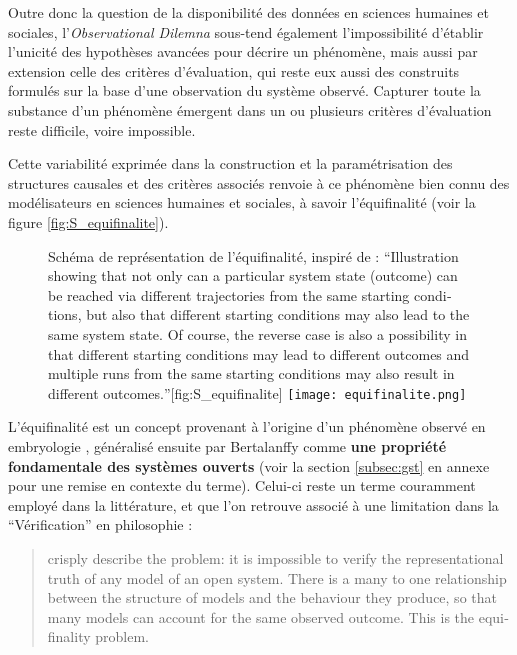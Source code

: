 Outre donc la question de la disponibilité des données en sciences humaines et sociales, l'\textit{Observational Dilemna} sous-tend également l'impossibilité d'établir l'unicité des hypothèses avancées pour décrire un phénomène, mais aussi par extension celle des critères d'évaluation, qui reste eux aussi des construits  formulés sur la base d'une observation du système observé. Capturer toute la substance d'un phénomène émergent dans un ou plusieurs critères d'évaluation reste difficile, voire impossible.

Cette variabilité exprimée dans la construction et la paramétrisation des structures causales et des critères associés renvoie à ce phénomène bien connu des modélisateurs en sciences humaines et sociales, à savoir l'équifinalité (voir la figure \ref{fig:S_equifinalite}).

\begin{figure}[htbp]
\begin{sidecaption}[fortoc]{Schéma de représentation de l'équifinalité, inspiré de \autocite{Richardson2002} : \foreignquote{english}{Illustration showing that not only can a particular system state (outcome) can be reached via different trajectories from the same starting conditions, but also that different starting conditions may also lead to the same system state. Of course, the reverse case is also a possibility in that different starting conditions may lead to different outcomes and multiple runs from the same starting conditions may also result in different outcomes.}}[fig:S_equifinalite]
  \centering
 \texttt{[image: equifinalite.png]}
  \end{sidecaption}
\end{figure}

L'équifinalité est un concept provenant à l'origine d'un phénomène observé en embryologie , généralisé ensuite par Bertalanffy comme \textbf{une propriété fondamentale des systèmes ouverts} (voir la section \ref{subsec:gst} en annexe pour une remise en contexte du terme). Celui-ci reste un terme couramment employé dans la littérature, et que l'on retrouve associé à une limitation dans la \enquote{Vérification}  en philosophie : 

\foreignblockquote{english}[\cites{OSullivan2004,Oreskes1994}]{\textcite{Oreskes1994} crisply describe the problem: it is impossible to verify the representational truth of any model of an open system. There is a many to one relationship between the structure of models and the behaviour they produce, so that many models can account for the same observed outcome. This is the equifinality problem.} 




